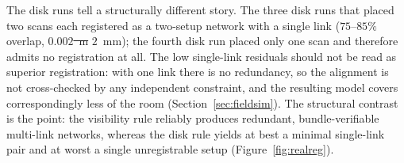 \documentclass[sensors,article,submit,pdftex,moreauthors]{Definitions/mdpi}
\providecommand{\DIFadd}[1]{{\protect\color{blue} \sf #1}} %
\providecommand{\DIFdel}[1]{{\protect\color{red}\protect\scriptsize\protect\sout{#1}}} %
\providecommand{\DIFaddbegin}{} %
\providecommand{\DIFaddend}{} %
\providecommand{\DIFdelbegin}{} %
\providecommand{\DIFdelend}{} %
\begin{document}
The disk runs tell a structurally different story. The three disk runs that
placed two scans each registered as a two-setup network with a single link
($75$--$85\%$ overlap, \DIFdelbegin \DIFdel{$0.002$~m}\DIFdelend \DIFaddbegin \DIFadd{$2$~mm}\DIFaddend ); the fourth disk run placed only one scan and
therefore admits no registration at all. The low single-link residuals should
not be read as superior registration: with one link there is no redundancy, so
the alignment is not cross-checked by any independent constraint, and the
resulting model covers correspondingly less of the room
(Section~\ref{sec:fieldsim}). The structural contrast is the point: the
visibility rule reliably produces redundant, bundle-verifiable multi-link
networks, whereas the disk rule yields at best a minimal single-link pair and
at worst a single unregistrable setup (Figure~\ref{fig:realreg}).
\end{document}
